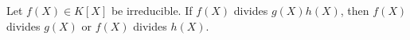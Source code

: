 Let $f(X) \in K[X]$ be irreducible. If $f(X)$ divides $g(X)h(X)$, then $f(X)$ divides $g(X)$ or $f(X)$ divides $h(X)$.
